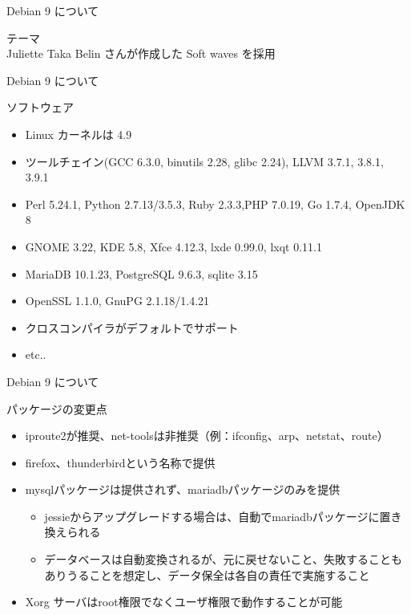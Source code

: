 \begin{frame}{Debian 9 について}%

テーマ\\
Juliette Taka Belin さんが作成した Soft waves を採用
\begin{center}
\end{center}
\end{frame}


\begin{frame}{Debian 9 について}%

ソフトウェア
\begin{itemize}
\item Linux カーネルは 4.9
\item ツールチェイン(GCC 6.3.0, binutils 2.28, glibc 2.24), LLVM 3.7.1, 3.8.1, 3.9.1
\item Perl 5.24.1, Python 2.7.13/3.5.3, Ruby 2.3.3,PHP 7.0.19, Go 1.7.4, OpenJDK 8
\item GNOME 3.22, KDE 5.8, Xfce 4.12.3, lxde 0.99.0, lxqt 0.11.1
\item MariaDB 10.1.23, PostgreSQL 9.6.3, sqlite 3.15
\item OpenSSL 1.1.0, GnuPG 2.1.18/1.4.21
\item クロスコンパイラがデフォルトでサポート
\item etc..
\end{itemize}

\end{frame}


\begin{frame}{Debian 9 について}%

パッケージの変更点
\begin{itemize}
\item iproute2が推奨、net-toolsは非推奨（例：ifconfig、arp、netstat、route）
\item firefox、thunderbirdという名称で提供
\item mysqlパッケージは提供されず、mariadbパッケージのみを提供
  \begin{itemize}
  \item jessieからアップグレードする場合は、自動でmariadbパッケージに置き換えられる
  \item データベースは自動変換されるが、元に戻せないこと、失敗することもありうることを想定し、データ保全は各自の責任で実施すること
  \end{itemize}
\item Xorg サーバはroot権限でなくユーザ権限で動作することが可能
\end{itemize}
\end{frame}



